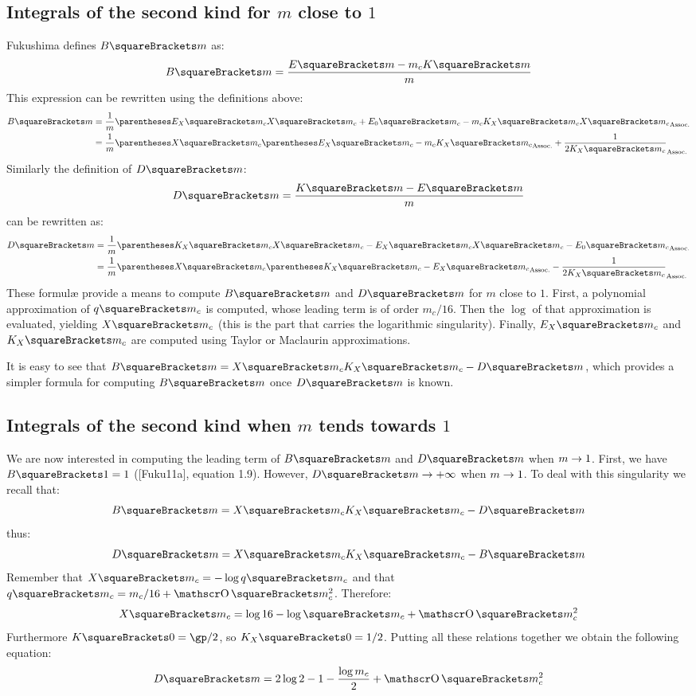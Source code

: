 \documentclass[10pt, a4paper, twoside]{basestyle}
\begin{document}
\subsection*{Integrals of the second kind for $m$ close to $1$}
Fukushima defines $B\of{m}$ as:
\[
B\of{m} = \frac{E\of{m} - m_c K\of{m}}{m}
\]
This expression can be rewritten using the definitions above:
\begin{align*}
B\of{m} &= \frac{1}{m}\pa{E_X\of{m_c} X\of{m_c} + E_0\of{m_c} - m_c K_X\of{m_c} X\of{m_c}}\\
&= \frac{1}{m}\pa{X\of{m_c}\pa{E_X\of{m_c} - m_c K_X\of{m_c}} + \frac{1}{2 K_X\of{m_c}}}
\end{align*}
Similarly the definition of $D\of{m}$:
\[
D\of{m} = \frac{K\of{m} - E\of{m}}{m}
\]
can be rewritten as:
\begin{align*}
D\of{m} &= \frac{1}{m}\pa{K_X\of{m_c} X\of{m_c} - E_X\of{m_c} X\of{m_c} - E_0\of{m_c}}\\
&= \frac{1}{m}\pa{X\of{m_c}\pa{K_X\of{m_c} - E_X\of{m_c}} - \frac{1}{2 K_X\of{m_c}}}
\end{align*}
These formulæ provide a means to compute $B\of{m}$ and $D\of{m}$ for $m$ close to $1$.  First, a polynomial approximation of $q\of{m_c}$
is computed, whose leading term is of order $m_c / 16$.  Then the $\log$ of that approximation is evaluated, yielding $X\of{m_c}$ (this
is the part that carries the logarithmic singularity).  Finally, $E_X\of{m_c}$ and $K_X\of{m_c}$ are computed using
Taylor or Maclaurin approximations.

It is easy to see that $B\of{m} = X\of{m_c} K_X\of{m_c} - D\of{m}$, which provides a simpler formula for computing $B\of{m}$ once 
$D\of{m}$ is known.

\subsection*{Integrals of the second kind when $m$ tends towards $1$}
We are now interested in computing the leading term of $B\of{m}$ and $D\of{m}$ when $\conv m 1$.  First, we have $B\of{1} = 1$ 
([Fuku11a], equation 1.9).  However, $\conv {D\of{m}} +\infty$ when $\conv m 1$.  To deal with this singularity we recall that:
\[
B\of{m} = X\of{m_c} K_X\of{m_c} - D\of{m}
\]
thus:
\[
D\of{m} = X\of{m_c} K_X\of{m_c} - B\of{m}
\]
Remember that $X\of{m_c} = -\log q\of{m_c}$ and that $q\of{m_c} = m_c / 16 + \BigO\of{m_c^2}$.  Therefore:
\[
X\of{m_c} = \log 16 - \log\of{m_c} + \BigO\of{m_c^2}
\]
Furthermore $K\of{0} = \gp / 2$, so $K_X\of{0} = 1/2$.  Putting all these relations together we obtain the following equation:
\[
D\of{m} = 2 \log 2 - 1 - \frac{\log m_c}{2} + \BigO\of{m_c^2}
\]
\end{document}
